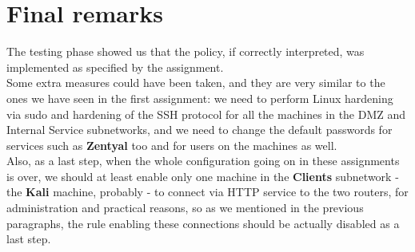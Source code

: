 \section{Final remarks}
The testing phase showed us that the policy, if correctly interpreted, was implemented as specified by the assignment.\\
Some extra measures could have been taken, and they are very similar to the ones we have seen in the first assignment: we need to perform Linux hardening via sudo and hardening of the SSH protocol for all the machines in the DMZ and Internal Service subnetworks, and we need to change the default passwords for services such as \textbf{Zentyal} too and for users on the machines as well.\\
Also, as a last step, when the whole configuration going on in these assignments is over, we should at least enable only one machine in the \textbf{Clients} subnetwork - the \textbf{Kali} machine, probably - to connect via HTTP service to the two routers, for administration and practical reasons, so as we mentioned in the previous paragraphs, the rule enabling these connections should be actually disabled as a last step.
